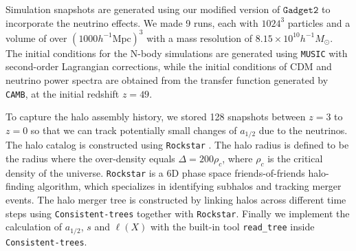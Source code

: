 Simulation snapshots are generated using our modified version of $\texttt{Gadget2}$ to incorporate the neutrino effects. We made 9 runs, each with $1024^3$ particles and a volume of over $(1000 h^{-1}\mathrm{Mpc})^3$ with a mass resolution of $8.15\times10^{10}h^{-1} M_\odot$. 
The initial conditions for the N-body simulations are generated using \texttt{MUSIC} with second-order Lagrangian corrections,
while the initial conditions of CDM and neutrino power spectra are obtained from the transfer function generated by \texttt{CAMB}, at the initial redshift $z=49$. 

To capture the halo assembly history, we stored 128 snapshots between $z=3$ to $z=0$ so that we can track potentially small changes of $a_{1/2}$ due to the neutrinos. The halo catalog is constructed using \texttt{Rockstar} \cite{rockstar}. The halo radius is defined to be the radius where the over-density equals $\Delta=200\rho_c$, where $\rho_c$ is the critical density of the universe. \texttt{Rockstar} is a 6D phase space friends-of-friends halo-finding algorithm, which specializes in identifying subhalos and tracking merger events. 
The halo merger tree is constructed by linking halos across different time steps using \texttt{Consistent-trees} \cite{ct} together with \texttt{Rockstar}. Finally we implement the calculation of $a_{1/2}$, $s$ and $\ell(X)$ with the built-in tool \texttt{read\_tree} inside \texttt{Consistent-trees}.